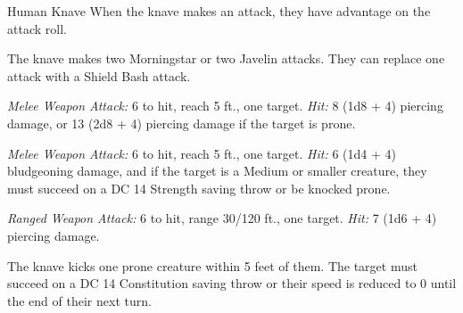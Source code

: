 \documentclass[10pt,a4paper,twoside,bg=print,twocolumn,openany,nodeprecatedcode]{dndbook}
\begin{document}
\begin{DndMonster}[float=t]{Human Knave}
\DndMonsterBasics[
armor-class = {16 (\textit{breastplate})},
hit-points = {\DndDice{8d8 + 24}},
speed = {30 ft.}
]
\DndMonsterAbilityScores[
 str = 18,
 dex = 10,
 con = 16,
 int = 10,
 wis = 12,
 cha = 10
]
\DndMonsterDetails[
skills = {Intimidation +4, Perception +3},
languages = {Common},
challenge = 3,
]
When the knave makes an attack, they have advantage on the attack roll.

The knave makes two Morningstar or two Javelin attacks. They can replace one attack with a Shield Bash attack.

\textsl{Melee Weapon Attack:} 6 to hit, reach 5 ft., one target. \textsl{Hit:} 8 (1d8 + 4) piercing damage, or 13 (2d8 + 4) piercing damage if the target is prone.

\textsl{Melee Weapon Attack:} 6 to hit, reach 5 ft., one target. \textsl{Hit:} 6 (1d4 + 4) bludgeoning damage, and if the target is a Medium or smaller creature, they must succeed on a DC 14 Strength saving throw or be knocked prone.

\textsl{Ranged Weapon Attack:} 6 to hit, range 30/120 ft., one target. \textsl{Hit:} 7 (1d6 + 4) piercing damage.

The knave kicks one prone creature within 5 feet of them. The target must succeed on a DC 14 Constitution saving throw or their speed is reduced to 0 until the end of their next turn.

\end{DndMonster}
\end{document}
